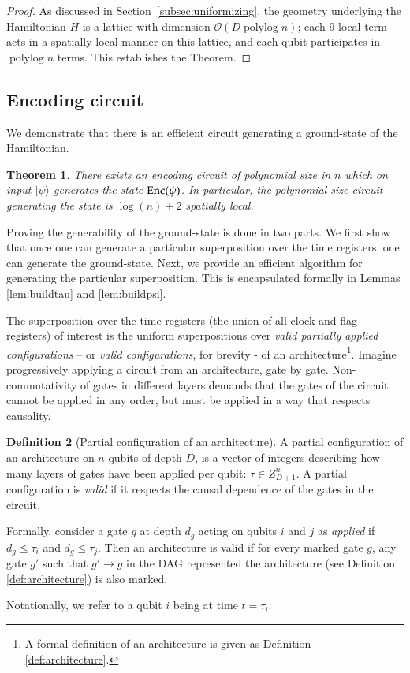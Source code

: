 \documentclass[11pt,letterpaper]{article}
\newtheorem{theorem}{Theorem}[section]
\theoremstyle{definition}
\newtheorem{definition}[theorem]{Definition}
\theoremstyle{remark}
\DeclareMathOperator{\polylog}{polylog}
\renewcommand{\leq}{\leqslant}
\numberwithin{equation}{section}
\theoremstyle{definition}
\newcommand{\ket}[1]{|#1\rangle}
\begin{document}
\begin{proof}
As discussed in Section~\ref{subsec:uniformizing}, the geometry underlying the Hamiltonian $H$ is a lattice with dimension $\mathcal{O}(D \polylog n)$; each $9$-local term acts in a spatially-local manner on this lattice, and each qubit participates in $\polylog n$ terms. 
This establishes the Theorem.
\end{proof}

%

\subsection{Encoding circuit}
\label{subsec:encoding_ckt}

We demonstrate that there is an efficient circuit generating a ground-state of the Hamiltonian.

\begin{theorem}
There exists an encoding circuit of polynomial size in $n$ which on input $\ket{\psi}$ generates the state $\mathrm{Enc}(\psi)$. In particular, the polynomial size circuit generating the state is $\log(n) + 2$ spatially local.
\label{thm:encodingckt}
\end{theorem}

Proving the generability of the ground-state is done in two parts. We first show that once one can generate a particular superposition over the time registers, one can generate the ground-state. Next, we provide an efficient algorithm for generating the particular superposition. This is encapsulated formally in Lemmas \ref{lem:buildtau} and \ref{lem:buildpsi}.

The superposition over the time registers (the union of all clock and flag registers) of interest is the uniform superpositions over \emph{valid partially applied configurations} -- or \emph{valid configurations}, for brevity - of an architecture\footnote{A formal definition of an architecture is given as Definition \ref{def:architecture}.}. Imagine progressively applying a circuit from an architecture, gate by gate. Non-commutativity of gates in different layers demands that the gates of the circuit cannot be applied in any order, but must be applied in a way that respects causality.

\begin{definition}[Partial configuration of an architecture]
\label{def:partial-config}
A partial configuration of an architecture on $n$ qubits of depth $D$, is a vector of integers describing how many layers of gates have been applied per qubit: $\tau \in Z_{D+1}^n$. A partial configuration is \emph{valid} if it respects the causal dependence of the gates in the circuit.

Formally, consider a gate $g$ at depth $d_g$ acting on qubits $i$ and $j$ as \emph{applied} if $d_g \leq \tau_i$ and $d_g \leq \tau_j$. Then an architecture is valid if for every marked gate $g$, any gate $g'$ such that $g' \rightarrow g$ in the DAG represented the architecture (see Definition \ref{def:architecture}) is also marked. 

Notationally, we refer to a qubit $i$ being at time $t = \tau_i$.
\end{definition}
\end{document}
